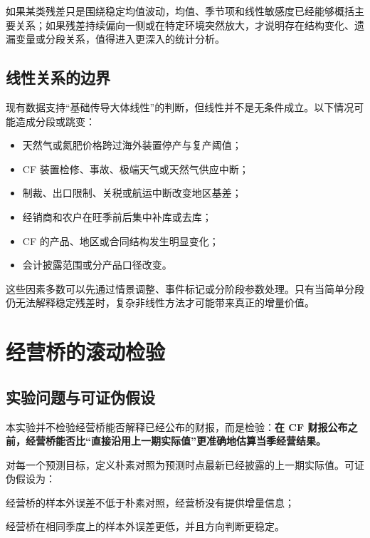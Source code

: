 \documentclass[11pt,a4paper]{ctexart}
\begin{document}
如果某类残差只是围绕稳定均值波动，均值、季节项和线性敏感度已经能够概括主要关系；如果残差持续偏向一侧或在特定环境突然放大，才说明存在结构变化、遗漏变量或分段关系，值得进入更深入的统计分析。

\subsection{线性关系的边界}

现有数据支持“基础传导大体线性”的判断，但线性并不是无条件成立。以下情况可能造成分段或跳变：

\begin{itemize}
  \item 天然气或氮肥价格跨过海外装置停产与复产阈值；
  \item CF 装置检修、事故、极端天气或天然气供应中断；
  \item 制裁、出口限制、关税或航运中断改变地区基差；
  \item 经销商和农户在旺季前后集中补库或去库；
  \item CF 的产品、地区或合同结构发生明显变化；
  \item 会计披露范围或分产品口径改变。
\end{itemize}

这些因素多数可以先通过情景调整、事件标记或分阶段参数处理。只有当简单分段仍无法解释稳定残差时，复杂非线性方法才可能带来真正的增量价值。

\section{经营桥的滚动检验}

\subsection{实验问题与可证伪假设}

本实验并不检验经营桥能否解释已经公布的财报，而是检验：\textbf{在 CF 财报公布之前，经营桥能否比“直接沿用上一期实际值”更准确地估算当季经营结果。}

对每一个预测目标，定义朴素对照为预测时点最新已经披露的上一期实际值。可证伪假设为：

\begin{description}[style=nextline]
  \item[零假设] 经营桥的样本外误差不低于朴素对照，经营桥没有提供增量信息；
  \item[备择假设] 经营桥在相同季度上的样本外误差更低，并且方向判断更稳定。
\end{description}
\end{document}

